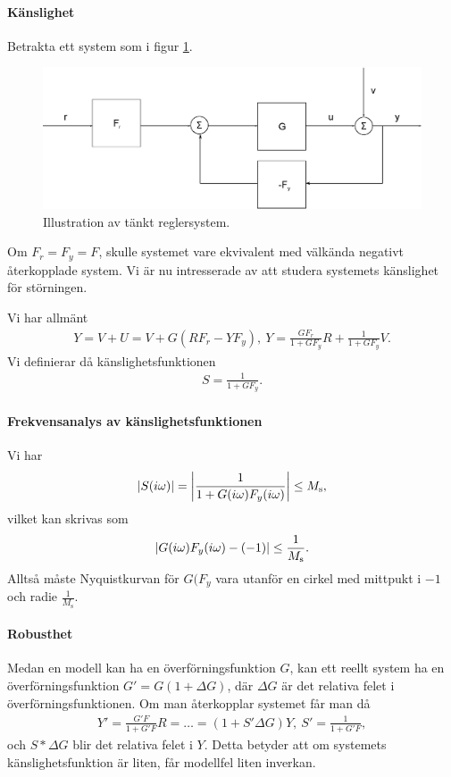 \paragraph{Känslighet}
Betrakta ett system som i figur \ref{fig:negative_feedback_equiv}.
\begin{figure}[!ht]
	\centering
	\includegraphics[width = \textwidth]{./Images/negative_feedback_equiv.eps}
	\caption{Illustration av tänkt reglersystem.}
	\label{fig:negative_feedback_equiv}
\end{figure}
Om $F_{r} = F_{y} = F$, skulle systemet vare ekvivalent med välkända negativt återkopplade system. Vi är nu intresserade av att studera systemets känslighet för störningen.

Vi har allmänt
\begin{align*}
	Y = V + U = V + G(RF_{r} - YF_{y}),\ Y = \frac{GF_{r}}{1 + GF_{y}}R + \frac{1}{1 + GF_{y}}V.
\end{align*}
Vi definierar då känslighetsfunktionen
\begin{align*}
	S = \frac{1}{1 + GF_{y}}.
\end{align*}

\paragraph{Frekvensanalys av känslighetsfunktionen}
Vi har
\begin{align*}
	\abs{S(i\omega)} = \abs{\frac{1}{1 + G(i\omega)F_{y}(i\omega)}} \leq M_{\text{s}},
\end{align*}
vilket kan skrivas som
\begin{align*}
	\abs{G(i\omega)F_{y}(i\omega) - (-1)} \leq \frac{1}{M_{\text{s}}}.
\end{align*}
Alltså måste Nyquistkurvan för $G(F_{y}$ vara utanför en cirkel med mittpukt i $-1$ och radie $\frac{1}{M_{\text{s}}}$.

\paragraph{Robusthet}
Medan en modell kan ha en överförningsfunktion $G$, kan ett reellt system ha en överförningsfunktion $G' = G(1 + \Delta G)$, där $\Delta G$ är det relativa felet i överförningsfunktionen. Om man återkopplar systemet får man då
\begin{align*}
	Y' = \frac{G'F}{1 + G'F}R = \dots = (1 + S'\Delta G)Y,\ S' = \frac{1}{1 + G'F},
\end{align*}
och $S*\Delta G$ blir det relativa felet i $Y$. Detta betyder att om systemets känslighetsfunktion är liten, får modellfel liten inverkan.

